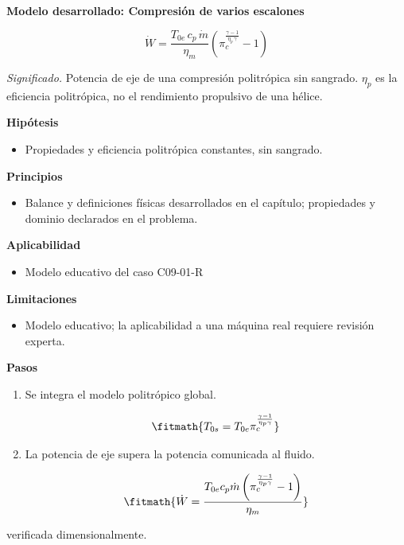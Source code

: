 \documentclass[10pt,openany]{book}
\begin{document}
\begin{tcolorbox}[title={Desarrollos del modelo}, studiumdef, breakable]

\noindent\textbf{Modelo desarrollado: Compresión de varios escalones}

\begin{equation}
\dot W=\frac{T_{0e}\,c_p\,\dot m}{\eta_m}\left(\pi_c^{\frac{\gamma-1}{\eta_p\,\gamma}}-1\right)
\label{eq:EC-C09}
\end{equation}

\noindent\textit{Significado.} Potencia de eje de una compresión politrópica sin sangrado. $\eta_p$ es la eficiencia politrópica, no el rendimiento propulsivo de una hélice.

\noindent\textbf{Hipótesis}
\begin{itemize}
\item Propiedades y eficiencia politrópica constantes, sin sangrado.
\end{itemize}

\noindent\textbf{Principios}
\begin{itemize}
\item Balance y definiciones físicas desarrollados en el capítulo; propiedades y dominio declarados en el problema.
\end{itemize}

\noindent\textbf{Aplicabilidad}
\begin{itemize}
\item Modelo educativo del caso C09-01-R
\end{itemize}

\noindent\textbf{Limitaciones}
\begin{itemize}
\item Modelo educativo; la aplicabilidad a una máquina real requiere revisión experta.
\end{itemize}

\noindent\textbf{Pasos}
\begin{enumerate}
\item
Se integra el modelo politrópico global.

\[
\fitmath{T_{0s}=T_{0e} \pi_c^{\frac{\gamma - 1}{\eta_p \gamma}}}
\]
\item
La potencia de eje supera la potencia comunicada al fluido.

\[
\fitmath{\dot{W}=\frac{T_{0e} c_p \dot m \left(\pi_c^{\frac{\gamma - 1}{\eta_p \gamma}} - 1\right)}{\eta_m}}
\]
\end{enumerate}

{\noindent\footnotesize verificada dimensionalmente.\par}
\end{tcolorbox}
\end{document}
